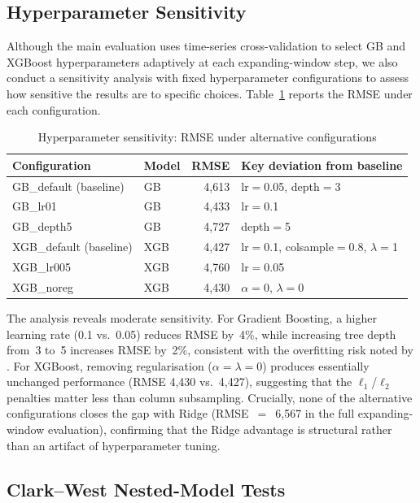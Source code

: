 \subsection{Hyperparameter Sensitivity}
\label{sec:ch1_sensitivity}

Although the main evaluation uses time-series cross-validation to select GB and XGBoost hyperparameters adaptively at each expanding-window step, we also conduct a sensitivity analysis with fixed hyperparameter configurations to assess how sensitive the results are to specific choices.  Table~\ref{tab:ch1_hyperparam} reports the RMSE under each configuration.

\begin{table}[htbp]
\centering
\caption{Hyperparameter sensitivity: RMSE under alternative configurations}
\label{tab:ch1_hyperparam}
\begin{tabular}{@{} l l r l @{}}
\toprule
{Configuration} & {Model} & {RMSE} & {Key deviation from baseline} \\
\midrule
GB\_default (baseline) & GB & 4{,}613 & lr$=$0.05, depth$=$3 \\
GB\_lr01               & GB & 4{,}433 & lr$=$0.1 \\
GB\_depth5             & GB & 4{,}727 & depth$=$5 \\
\addlinespace
XGB\_default (baseline)& XGB & 4{,}427 & lr$=$0.1, colsample$=$0.8, $\lambda=$1 \\
XGB\_lr005             & XGB & 4{,}760 & lr$=$0.05 \\
XGB\_noreg             & XGB & 4{,}430 & $\alpha=$0, $\lambda=$0 \\
\bottomrule
\end{tabular}
\end{table}

The analysis reveals moderate sensitivity.  For Gradient Boosting, a higher learning rate (0.1 vs.\ 0.05) reduces RMSE by~4\%, while increasing tree depth from~3 to~5 increases RMSE by~2\%, consistent with the overfitting risk noted by \citet{gouletcoulombe2022how}.  For XGBoost, removing regularisation ($\alpha = \lambda = 0$) produces essentially unchanged performance (RMSE 4{,}430 vs.\ 4{,}427), suggesting that the $\ell_1$/$\ell_2$ penalties matter less than column subsampling.  Crucially, none of the alternative configurations closes the gap with Ridge (RMSE~$=$~6{,}567 in the full expanding-window evaluation), confirming that the Ridge advantage is structural rather than an artifact of hyperparameter tuning.

\subsection{Clark--West Nested-Model Tests}

